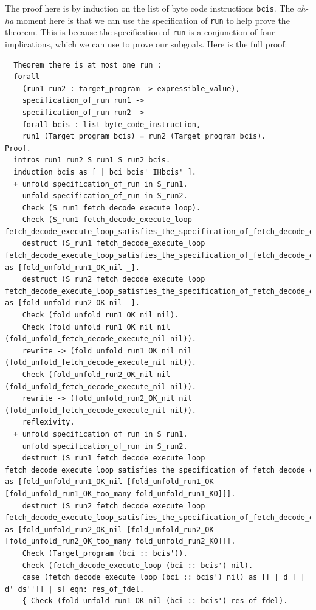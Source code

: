 \documentclass{article}
\begin{document}
The proof here is by induction on the list of byte code instructions \texttt{bcis}. The \emph{ah-ha} moment here is that we can use the specification of \texttt{run} to help prove the theorem. This is because the specification of \texttt{run} is a conjunction of four implications, which we can use to prove our subgoals. Here is the full proof:

\begin{lstlisting}
  Theorem there_is_at_most_one_run :
  forall
    (run1 run2 : target_program -> expressible_value),
    specification_of_run run1 ->
    specification_of_run run2 ->
    forall bcis : list byte_code_instruction,
    run1 (Target_program bcis) = run2 (Target_program bcis).
Proof.
  intros run1 run2 S_run1 S_run2 bcis.
  induction bcis as [ | bci bcis' IHbcis' ].
  + unfold specification_of_run in S_run1.
    unfold specification_of_run in S_run2.
    Check (S_run1 fetch_decode_execute_loop).
    Check (S_run1 fetch_decode_execute_loop fetch_decode_execute_loop_satisfies_the_specification_of_fetch_decode_execute_loop).
    destruct (S_run1 fetch_decode_execute_loop fetch_decode_execute_loop_satisfies_the_specification_of_fetch_decode_execute_loop) as [fold_unfold_run1_OK_nil _].
    destruct (S_run2 fetch_decode_execute_loop fetch_decode_execute_loop_satisfies_the_specification_of_fetch_decode_execute_loop) as [fold_unfold_run2_OK_nil _].
    Check (fold_unfold_run1_OK_nil nil).
    Check (fold_unfold_run1_OK_nil nil (fold_unfold_fetch_decode_execute_nil nil)).
    rewrite -> (fold_unfold_run1_OK_nil nil (fold_unfold_fetch_decode_execute_nil nil)).
    Check (fold_unfold_run2_OK_nil nil (fold_unfold_fetch_decode_execute_nil nil)).
    rewrite -> (fold_unfold_run2_OK_nil nil (fold_unfold_fetch_decode_execute_nil nil)).
    reflexivity.
  + unfold specification_of_run in S_run1.
    unfold specification_of_run in S_run2.
    destruct (S_run1 fetch_decode_execute_loop fetch_decode_execute_loop_satisfies_the_specification_of_fetch_decode_execute_loop) as [fold_unfold_run1_OK_nil [fold_unfold_run1_OK [fold_unfold_run1_OK_too_many fold_unfold_run1_KO]]].
    destruct (S_run2 fetch_decode_execute_loop fetch_decode_execute_loop_satisfies_the_specification_of_fetch_decode_execute_loop) as [fold_unfold_run2_OK_nil [fold_unfold_run2_OK [fold_unfold_run2_OK_too_many fold_unfold_run2_KO]]].
    Check (Target_program (bci :: bcis')).
    Check (fetch_decode_execute_loop (bci :: bcis') nil).
    case (fetch_decode_execute_loop (bci :: bcis') nil) as [[ | d [ | d' ds'']] | s] eqn: res_of_fdel.
    { Check (fold_unfold_run1_OK_nil (bci :: bcis') res_of_fdel).

\end{lstlisting}
\end{document}
